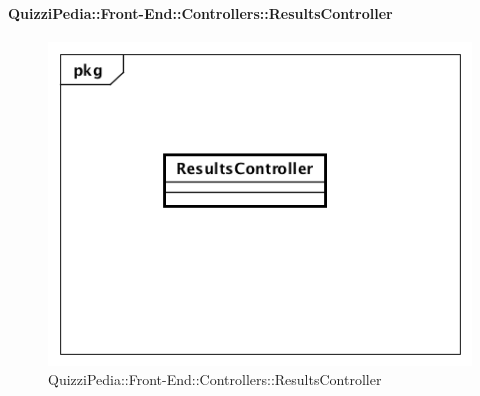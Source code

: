 \paragraph{QuizziPedia::Front-End::Controllers::ResultsController}
\begin{figure} [ht]
	\centering
	\includegraphics[scale=0.45]{UML/Classi/Front-End/QuizziPedia_Front-end_Controller_ResultsController.png}
	\caption{QuizziPedia::Front-End::Controllers::ResultsController}
\end{figure} \FloatBarrier
